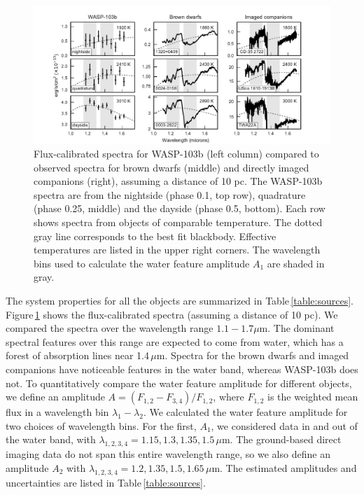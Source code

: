\documentclass[twocolumn]{aastex61}
\begin{document}
\begin{figure}
\includegraphics[width = 1.0\textwidth]{Figures/spectra_comparison.pdf}
\caption{Flux-calibrated spectra for WASP-103b (left column) compared to observed spectra for brown dwarfs (middle) and directly imaged companions (right), assuming a distance of 10 pc. The WASP-103b spectra are from the nightside (phase 0.1, top row), quadrature (phase 0.25, middle) and the dayside (phase 0.5, bottom). Each row shows spectra from objects of comparable temperature. The dotted gray line corresponds to the best fit blackbody. Effective temperatures are listed in the upper right corners. The wavelength bins used to calculate the water feature amplitude $A_1$ are shaded in gray.}
\label{fig:planetstarcomparison}
\end{figure}

The system properties for all the objects are summarized in Table\,\ref{table:sources}.  Figure\,\ref{fig:planetstarcomparison} shows the flux-calibrated spectra (assuming a distance of 10 pc).  We compared the spectra over the wavelength range $1.1 - 1.7\mu$m. The dominant spectral features over this range are expected to come from water, which has a forest of absorption lines near 1.4\,$\mu$m. Spectra for the brown dwarfs and imaged companions have noticeable features in the water band, whereas WASP-103b does not. To quantitatively compare the water feature amplitude for different objects, we define an amplitude $A = (F_{1,2} - F_{3,4})/F_{1,2}$, where $F_{1,2}$ is the weighted mean flux in a wavelength bin $\lambda_1 - \lambda_2$. We calculated the water feature amplitude for two choices of wavelength bins. For the first, $A_1$, we considered data in and out of the water band, with $\lambda_{1,2,3,4} = 1.15, 1.3, 1.35, 1.5\,\mu$m. The ground-based direct imaging data do not span this entire wavelength range, so we also define an amplitude $A_2$ with $\lambda_{1,2,3,4} = 1.2, 1.35, 1.5, 1.65\,\mu$m. The estimated amplitudes and uncertainties are listed in Table\,\ref{table:sources}.
 
\end{document}
